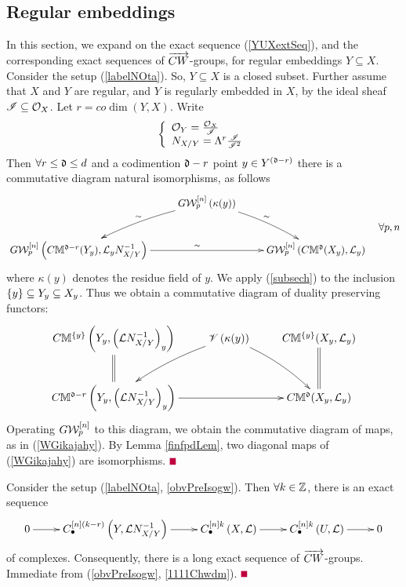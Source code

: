 \documentclass[12pt]{article}
\begin{document}
\subsection{Regular embeddings}
In this section, we expand on the exact sequence (\ref{YUXextSeq}), and the corresponding 
exact sequences of $\ora{CW}$-groups, for regular embeddings $Y\subseteq X$. 
\bL\label{obvPreIsogw}{\rm 
Consider the setup (\ref{labelNOta}). So, $Y\subseteq X$ is a closed subset. Further assume that $X$ and $Y$ are regular, and $Y$ is regularly embedded in $X$, by the ideal sheaf ${\SI}\subseteq {\CO}_X$. Let  
$r=co\dim(Y, X)$. Write 
$$
\LBrace{{l}
{\CO}_Y=\frac{{\CO}_X}{{\SI}}\\
N_{X/Y}=\Lambda^r\frac{{\SI}}{{\SI}^2}\\
}
$$
Then  $\forall r\leq \d \leq d$ and a codimention $\d-r$ point 
$y\in Y^{\LRf{\d-r}}$ there is a commutative diagram natural isomorphisms, as follows
\begin{equation}\label{WGikajahy}
\diagram 
&G{\CW}_p^{\LRt{n}}\LRf{\kappa(y)}\ar@/^/[dr]^{\sim} \ar@/_/[dl]_{\sim}&\\
G{\CW}_p^{\LRt{n}}\LRf{C{\BM}^{\d-r}(Y_y) ,{\CL}_yN_{X/Y}^{-1}}\ar[rr]^{\sim}
&& G{\CW}_p^{\LRt{n}}\LRf{C{\BM}^{\d}(X_y), {\CL}_y}\\
\enddiagram\quad \forall p, n
\end{equation}
where $\kappa(y)$ denotes the residue field of $y$. 
}
\eL
\pf %
We apply (\ref{subsech}) to the inclusion $\LRs{y} \subseteq Y_y \subseteq X_y$. Thus we obtain a commutative diagram of duality 
preserving  functors:
$$
\diagram 
C{\BM}^{\LRs{y}}\LRf{Y_y, \LRf{{\CL}N_{X/Y}^{-1}}_y}\ar@{=}[d]&{\SV}\LRf{\kappa(y)}\ar@/^/[dr] \ar@/_/[dl]&
C{\BM}^{\LRs{y}}(X_y, {\CL}_y)\ar@{=}[d]\\
C{\BM}^{\d-r}\LRf{Y_y, \LRf{{\CL}N_{X/Y}^{-1}}_y} \ar[rr] && C{\BM}^{\d}(X_y, {\CL}_y)\\
\enddiagram 
$$
Operating $G{\CW}_p^{\LRt{n}}$ to this diagram, we obtain the commutative diagram of maps, as in   (\ref{WGikajahy}).
By Lemma \ref{finfpdLem},  two diagonal maps of (\ref{WGikajahy}) are isomorphisms. 
\pic $\eop$

\bL\label{refhKwwdm}{\rm 
Consider the setup (\ref{labelNOta}, \ref{obvPreIsogw}). Then $\forall k\in {\BZ}$,
% 
there is an exact sequence 
\begin{equation}\label{CBulSeqEqn}
\diagram 
0 \ar[r] & C^{\LRt{n}(k-r)}_{\bul}\LRf{Y, {\CL}N_{X/Y}^{-1}} \ar[r] & C^{\LRt{n}k}_{\bul}\LRf{X, {\CL}} \ar[r] &  C^{\LRt{n}k}_{\bul}\LRf{U, {\CL}} \ar[r] & 0\\
\enddiagram
\end{equation}  
of complexes. 
Consequently, there is a long exact sequence of $\ora{CW}$-groups. %
}
\eL
\pf Immediate from (\ref{obvPreIsogw}, \ref{1111Chwdm}).  $\eop$ 
\end{document}
